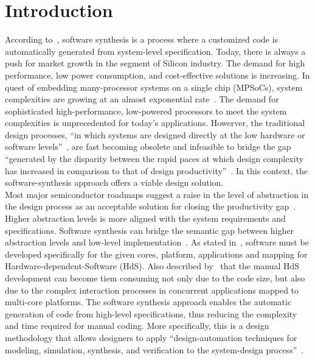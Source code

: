 \section{Introduction}
According to~\cite{Tavares.}, software synthesis is a process where a customized code is automatically generated from system-level specification. Today, there is always a push for market growth in the segment of Silicon industry. The demand for high performance, low power consumption, and cost-effective solutions is increasing. In quest of embedding many-processor systems on a single chip (MPSoCs), system complexities are growing at an almost exponential rate~\cite{Gajski.2009}. The demand for sophisticated high-performance, low-powered processors to meet the system complexities is unprecedented for today's applications. Howerver, the traditional design processes, ``in which systems are designed directly at the low hardware or software levels''~\cite{Gajski.2009}, are fast becoming obsolete and infeasible to bridge the gap ``generated by the disparity between the rapid paces at which design complexity has increased in comparison to that of design productivity''~\cite{Gajski.2009}. In this context, the software-synthesis approach offers a viable design solution.\\
Most major semiconductor roadmaps suggest a raise in the level of abstraction in the design process as an acceptable solution for closing the productivity gap~\cite{Gajski.2009}. Higher abstraction levels is more aligned with the system requirements and specifications. Software synthesis can bridge the semantic gap between higher abstraction levels and low-level implementation~\cite{Gajski.2009}. As stated in~\cite{Abdi.}, software must be developed specifically for the given cores, platform, applications and mapping for Hardware-dependent-Software (HdS). Also described by~\cite{Abdi.} that the manual HdS development can become tiem consuming not only due to the code size, but also due to the complex interaction processes in concurrent applications mapped to multi-core platforms. The software synthesis approach enables the automatic generation of code from high-level specifications, thus reducing the complexity and time required for manual coding. More specifically, this is a design methodology that allows designers to apply ``design-automation techniques for modeling, simulation, synthesis, and verification to the system-design process''~\cite{Gajski.2009}.
